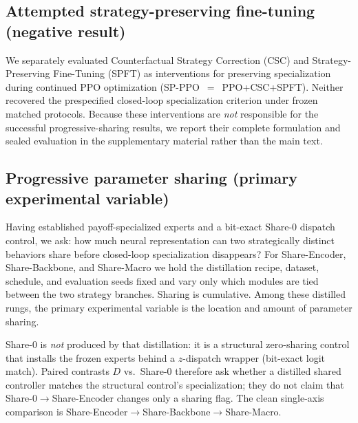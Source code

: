 \documentclass{article}
\begin{document}
\subsection{Attempted strategy-preserving fine-tuning (negative result)}
\label{sec:spppo}

We separately evaluated Counterfactual Strategy Correction (CSC) and
Strategy-Preserving Fine-Tuning (SPFT) as interventions for preserving
specialization during continued PPO optimization (SP-PPO~$=$~PPO+CSC+SPFT).
Neither recovered the prespecified closed-loop specialization criterion under
frozen matched protocols. Because these interventions are \emph{not} responsible
for the successful progressive-sharing results, we report their complete
formulation and sealed evaluation in the supplementary material rather than the
main text.

\subsection{Progressive parameter sharing (primary experimental variable)}
\label{sec:sharing}

Having established payoff-specialized experts and a bit-exact Share-0 dispatch
control, we ask: how much neural representation can two strategically distinct
behaviors share before closed-loop specialization disappears? For
Share-Encoder, Share-Backbone, and Share-Macro we hold the distillation recipe,
dataset, schedule, and evaluation seeds fixed and vary only which modules are
tied between the two strategy branches. Sharing is cumulative. Among these
distilled rungs, the primary experimental variable is the location and amount of
parameter sharing.

Share-0 is \emph{not} produced by that distillation: it is a structural
zero-sharing control that installs the frozen experts behind a $z$-dispatch
wrapper (bit-exact logit match). Paired contrasts $D$ vs.\ Share-0 therefore
ask whether a distilled shared controller matches the structural control's
specialization; they do not claim that Share-0$\rightarrow$Share-Encoder
changes only a sharing flag. The clean single-axis comparison is
Share-Encoder$\rightarrow$Share-Backbone$\rightarrow$Share-Macro.
\end{document}
